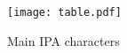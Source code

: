 \documentclass[tikz]{article}
\begin{document}
\begin{figure}
\centerline{
    \texttt{[image: table.pdf]}
}
\caption{Main IPA characters}
\end{figure}
\end{document}
